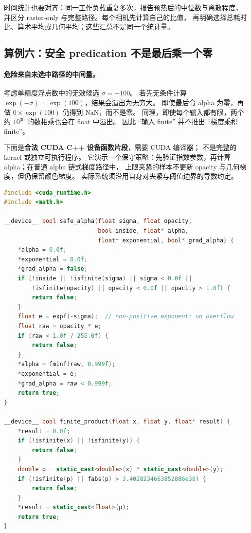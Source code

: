 时间统计也要对齐：同一工作负载重复多次，报告预热后的中位数与离散程度，
并区分 raster-only 与完整路径。每个相机先计算自己的比值，
再明确选择总耗时比、算术平均或几何平均；这些汇总不是同一个统计量。

\subsection{算例六：安全 predication 不是最后乘一个零}

\paragraph{危险来自未选中路径的中间量。}
考虑单精度浮点数中的无效候选 \(\sigma=-100\)。
若先无条件计算 \(\exp(-\sigma)=\exp(100)\)，结果会溢出为无穷大。
即使最后令 alpha 为零，再做
\(0\times\exp(100)\) 仍得到 NaN，而不是零。
同理，即使每个输入都有限，两个约 \(10^{30}\) 的数相乘也会在 float 中溢出。
因此 ``输入 finite'' 并不推出 ``梯度乘积 finite''。

下面是\textbf{合法 CUDA C++ 设备函数片段}，需要 CUDA 编译器；
不是完整的 kernel 或独立可执行程序。
它演示一个保守策略：先验证指数参数，再计算 alpha；在普通 alpha 链式梯度路径中，
上限夹紧的样本不更新 opacity 与几何梯度，但仍保留颜色梯度。
实际系统须沿用自身对夹紧与阈值边界的导数约定。
\begin{lstlisting}[language=C++]
#include <cuda_runtime.h>
#include <math.h>

__device__ bool safe_alpha(float sigma, float opacity,
                           bool inside, float* alpha,
                           float* exponential, bool* grad_alpha) {
    *alpha = 0.0f;
    *exponential = 0.0f;
    *grad_alpha = false;
    if (!inside || !isfinite(sigma) || sigma < 0.0f ||
        !isfinite(opacity) || opacity < 0.0f || opacity > 1.0f) {
        return false;
    }
    float e = expf(-sigma);  // non-positive exponent: no overflow
    float raw = opacity * e;
    if (raw < 1.0f / 255.0f) {
        return false;
    }
    *alpha = fminf(raw, 0.999f);
    *exponential = e;
    *grad_alpha = raw < 0.999f;
    return true;
}

__device__ bool finite_product(float x, float y, float* result) {
    *result = 0.0f;
    if (!isfinite(x) || !isfinite(y)) {
        return false;
    }
    double p = static_cast<double>(x) * static_cast<double>(y);
    if (!isfinite(p) || fabs(p) > 3.4028234663852886e38) {
        return false;
    }
    *result = static_cast<float>(p);
    return true;
}
\end{lstlisting}

